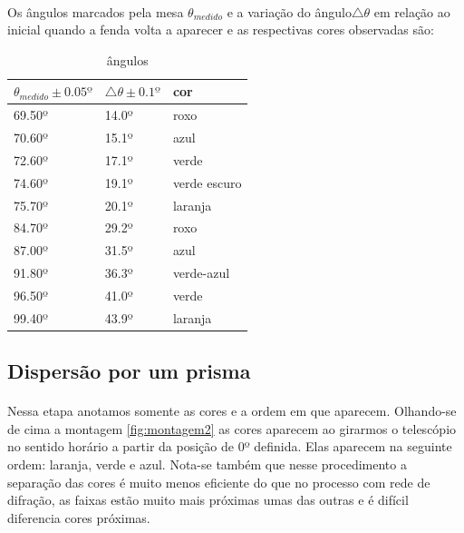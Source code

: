 \documentclass[a4paper,11pt]{article}
\begin{document}
\paragraph{} Os ângulos marcados pela mesa $\theta_{medido}$
e a variação do ângulo$\triangle \theta$ em relação ao inicial
quando a fenda volta a aparecer e as respectivas cores observadas são:
\begin{table}[!htp]
    \centering
    \begin{tabular}{|l|l|l|}\hline
        $ \theta_{medido}\pm 0.05º$ &$\triangle \theta \pm 0.1º$ & cor \\ \hline
        69.50º & 14.0º  &roxo\\ \hline
        70.60º & 15.1º  &azul\\ \hline
        72.60º & 17.1º  &verde \\ \hline
        74.60º & 19.1º  &verde escuro\\ \hline
        75.70º & 20.1º  &laranja\\ \hline
        
        84.70º & 29.2º  &roxo\\ \hline
        87.00º & 31.5º  &azul\\ \hline
        91.80º & 36.3º  &verde-azul   \\ \hline
        96.50º & 41.0º  &verde   \\ \hline
        99.40º & 43.9º  &laranja   \\ \hline
    \end{tabular}
  \caption{ângulos}
\end{table}

\subsection{Dispersão por um prisma}

\paragraph{}Nessa etapa anotamos somente as cores e a ordem
em que aparecem. Olhando-se de cima a montagem
\ref{fig:montagem2} as cores aparecem ao girarmos o
telescópio no sentido horário a partir da posição de 0º
definida. Elas aparecem na seguinte ordem: laranja, verde e
azul. Nota-se também que nesse procedimento a separação das
cores é muito menos eficiente do que no processo com rede de
difração, as faixas estão muito mais próximas umas das
outras e é difícil diferencia cores próximas.
\end{document}
